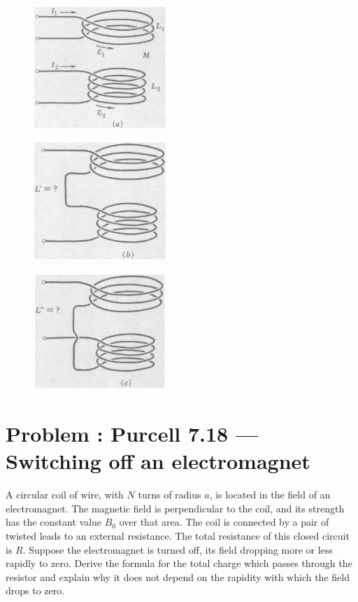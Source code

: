 \documentclass[problems]{esg8022pset}
\begin{document}
  \begin{figure}[H]
    \centering
    \includegraphics[width = 5cm]{pu711a}
    \label{fig:crossbar}
  \end{figure}


  \begin{figure}[H]
    \centering
    \includegraphics[width = 5cm]{pu711b}
    \label{fig:crossbar}
  \end{figure}

  \begin{figure}[H]
    \centering
    \includegraphics[width = 5cm]{pu711c}
    \label{fig:crossbar}
  \end{figure}


\section{Problem \thesection: Purcell 7.18 --- Switching off an electromagnet}
A circular coil of wire, with $N$ turns of radius $a$, is located in the field of an electromagnet.
The magnetic field is perpendicular to the coil, and its strength has the constant value $B_{0}$ over that area.
The coil is connected by a pair of twisted leads to an external resistance. The total resistance of this closed
 circuit is $R$. Suppose the electromagnet is turned off, its field dropping more or less rapidly to zero. Derive
  the formula for the total charge which passes through the resistor and explain why it does not depend on the rapidity
  with which the field drops to zero.
\end{document}
